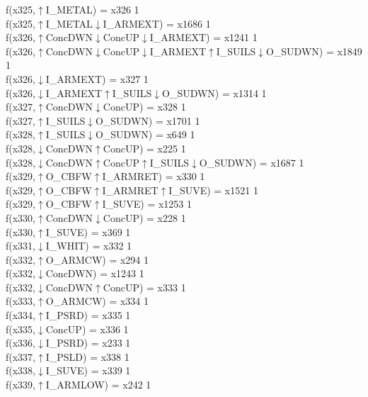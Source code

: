 f(x325,$\uparrow$I\_METAL) = x326 {1} \\
f(x325,$\uparrow$I\_METAL$\downarrow$I\_ARMEXT) = x1686 {1} \\
f(x326,$\uparrow$ConcDWN$\downarrow$ConcUP$\downarrow$I\_ARMEXT) = x1241 {1} \\
f(x326,$\uparrow$ConcDWN$\downarrow$ConcUP$\downarrow$I\_ARMEXT$\uparrow$I\_SUILS$\downarrow$O\_SUDWN) = x1849 {1} \\
f(x326,$\downarrow$I\_ARMEXT) = x327 {1} \\
f(x326,$\downarrow$I\_ARMEXT$\uparrow$I\_SUILS$\downarrow$O\_SUDWN) = x1314 {1} \\
f(x327,$\uparrow$ConcDWN$\downarrow$ConcUP) = x328 {1} \\
f(x327,$\uparrow$I\_SUILS$\downarrow$O\_SUDWN) = x1701 {1} \\
f(x328,$\uparrow$I\_SUILS$\downarrow$O\_SUDWN) = x649 {1} \\
f(x328,$\downarrow$ConcDWN$\uparrow$ConcUP) = x225 {1} \\
f(x328,$\downarrow$ConcDWN$\uparrow$ConcUP$\uparrow$I\_SUILS$\downarrow$O\_SUDWN) = x1687 {1} \\
f(x329,$\uparrow$O\_CBFW$\uparrow$I\_ARMRET) = x330 {1} \\
f(x329,$\uparrow$O\_CBFW$\uparrow$I\_ARMRET$\uparrow$I\_SUVE) = x1521 {1} \\
f(x329,$\uparrow$O\_CBFW$\uparrow$I\_SUVE) = x1253 {1} \\
f(x330,$\uparrow$ConcDWN$\downarrow$ConcUP) = x228 {1} \\
f(x330,$\uparrow$I\_SUVE) = x369 {1} \\
f(x331,$\downarrow$I\_WHIT) = x332 {1} \\
f(x332,$\uparrow$O\_ARMCW) = x294 {1} \\
f(x332,$\downarrow$ConcDWN) = x1243 {1} \\
f(x332,$\downarrow$ConcDWN$\uparrow$ConcUP) = x333 {1} \\
f(x333,$\uparrow$O\_ARMCW) = x334 {1} \\
f(x334,$\uparrow$I\_PSRD) = x335 {1} \\
f(x335,$\downarrow$ConcUP) = x336 {1} \\
f(x336,$\downarrow$I\_PSRD) = x233 {1} \\
f(x337,$\uparrow$I\_PSLD) = x338 {1} \\
f(x338,$\downarrow$I\_SUVE) = x339 {1} \\
f(x339,$\uparrow$I\_ARMLOW) = x242 {1} \\
